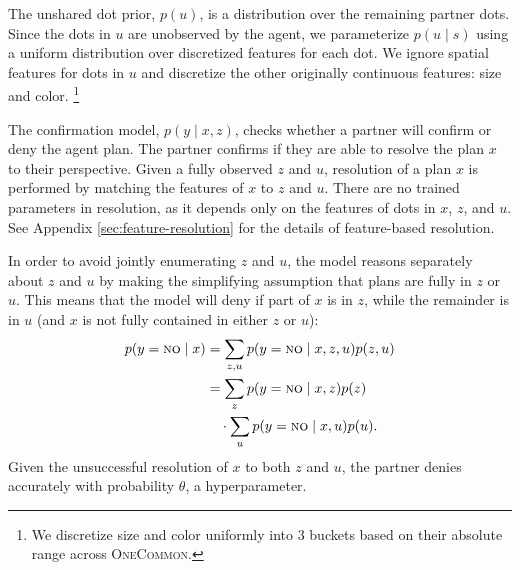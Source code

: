 \documentclass[11pt]{article}
\newcommand{\justin}[1]{{{\textcolor{purple}{(Justin: #1)}}}}
\newcommand{\daniel}[1]{{{\textcolor{red}{(Daniel: #1)}}}}
\begin{document}
The unshared dot prior, $p(u)$, is a distribution over the remaining partner dots.
Since the dots in $u$ are unobserved by the agent, we parameterize $p(u \mid s)$ using a uniform distribution over discretized features for each dot.
We ignore spatial features for dots in $u$
and discretize the other originally continuous features: size and color.%
\footnote{
We discretize size and color uniformly into 3 buckets based on their absolute range
across \textsc{OneCommon}.
}




The confirmation model, $p(y \mid x,z)$, checks whether a partner will confirm or deny the agent plan. The partner confirms if they are able to resolve the plan $x$ to their perspective. Given a fully observed $z$ and $u$, resolution of a plan $x$ is performed by matching the features of $x$ to $z$ and $u$.
There are no trained parameters in resolution, as it depends only on the features of dots in $x$, $z$, and $u$.
See Appendix \ref{sec:feature-resolution} for the details of feature-based resolution.

In order to avoid jointly enumerating $z$ and $u$, the model reasons separately about $z$ and $u$ by making the simplifying assumption that plans are fully in $z$ or $u$.
This means that the model will deny if part of $x$ is in $z$, while the remainder is in $u$ (and $x$ is not fully contained in either $z$ or $u$):
\begin{align*}
p(y=\textsc{no}\mid x) &=\sum_{z,u} p(y=\textsc{no} \mid x, z, u)p(z,u)\\
&=\sum_z p(y=\textsc{no}\mid x, z )p(z)\\
&\quad \cdot \sum_u p(y=\textsc{no}\mid  x, u )p(u).
\end{align*}
Given the unsuccessful resolution of $x$ to both $z$ and $u$, the partner denies accurately with probability $\theta$, a hyperparameter.
\end{document}
